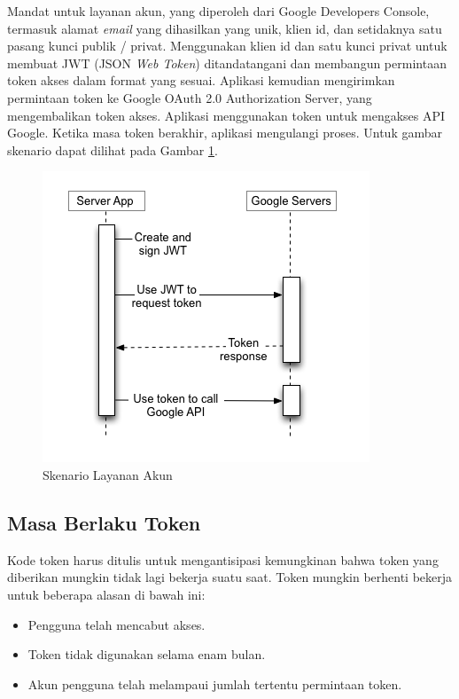 \begin{itemize}
Mandat untuk layanan akun, yang diperoleh dari Google Developers Console, termasuk alamat {\it email} yang dihasilkan yang unik, klien id, dan setidaknya satu pasang kunci publik / privat. Menggunakan klien id dan satu kunci privat untuk membuat JWT (JSON {\it Web Token}) ditandatangani dan membangun permintaan token akses dalam format yang sesuai. Aplikasi kemudian mengirimkan permintaan token ke Google OAuth 2.0 Authorization Server, yang mengembalikan token akses. Aplikasi menggunakan token untuk mengakses API Google. Ketika masa token berakhir, aplikasi mengulangi proses. Untuk gambar skenario dapat dilihat pada Gambar \ref{fig:skenariolayananakun}.

\begin{figure}[h]
\centering
\includegraphics[scale=1]{Gambar/skenario4.png}
\caption[Skenario Layanan Akun]{Skenario Layanan Akun}
\label{fig:skenariolayananakun}
\end{figure}
\end{itemize}

\subsection{Masa Berlaku Token}
Kode token harus ditulis untuk mengantisipasi kemungkinan bahwa token yang diberikan mungkin tidak lagi bekerja suatu saat. Token mungkin berhenti bekerja untuk beberapa alasan di bawah ini:

\begin{itemize}
\item
Pengguna telah mencabut akses.
\item
Token tidak digunakan selama enam bulan.
\item
Akun pengguna telah melampaui jumlah tertentu permintaan token.
\end{itemize}

